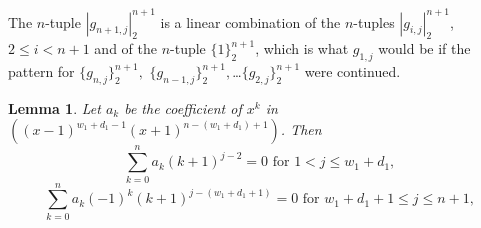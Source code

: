 \documentclass[10pt,reqno]{amsart}
\theoremstyle{plain}
\newtheorem{Lem}[Thm]{Lemma}
\theoremstyle{definition}
\theoremstyle{remark}
\def\determinant#1{\left|#1\right|}
\begin{document}
The $n$-tuple $\determinant{g_{n+1,j}}_2^{n+1}$ is a linear combination of
the $n$-tuples $\determinant{g_{i,j}}_2^{n+1}$, $2\leq i<n+1$ and of
the $n$-tuple $\{1\}_2^{n+1}$, which is what $g_{1,j}$ would
be if the pattern for $\{g_{n,j}\}_2^{n+1},$
$\{g_{n-1,j}\}_2^{n+1},$\dots $\{g_{2,j}\}_2^{n+1}$ were
continued.

\begin{Lem}\label{Lem:kato}
Let $a_k$ be the
coefficient of $x^k$ in $((x-1)^{w_1+d_1-1} (x+1)^{n-(w_1+d_1)+1})$. Then
\begin{equation}
\sum_{k=0}^{n} a_k (k+1)^{j-2} = 0 \text{ for } 1<j\leq w_1+d_1,
\end{equation}
\begin{equation}
\sum_{k=0}^{n} a_k (-1)^k (k+1)^{j-(w_1+d_1+1)} = 0 
\text{ for } w_1+d_1+1\leq j\leq n+1,
\end{equation}
\end{Lem}
\end{document}

